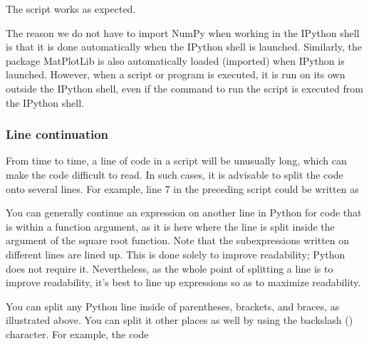 \documentclass[letterpaper,10pt,english]{sphinxmanual}
\begin{document}
\sphinxAtStartPar
The script works as expected.

\sphinxAtStartPar
The reason we do not have to import NumPy when working in the IPython shell is that it is done automatically when the IPython shell is launched.  Similarly, the package MatPlotLib is also automatically loaded (imported) when IPython is launched.  However, when a script or program is executed, it is run on its own outside the IPython shell, even if the command to run the script is executed from the IPython shell.

\ignorespaces 

\subsubsection{Line continuation}
\label{\detokenize{chap2/chap2_basics:line-continuation}}\label{\detokenize{chap2/chap2_basics:index-18}}
\sphinxAtStartPar
From time to time, a line of code in a script will be unusually long, which can make the code difficult to read.  In such cases, it is advisable to split the code onto several lines. For example, line 7 in the preceding script could be written as

\begin{sphinxVerbatim}[commandchars=\\\{\}]
\end{sphinxVerbatim}

\sphinxAtStartPar
You can generally continue an expression on another line in Python for code that is within a function argument, as it is here where the line is split inside the argument of the square root function.  Note that the sub\sphinxhyphen{}expressions written on different lines are lined up.  This is done solely to improve readability; Python does not require it. Nevertheless, as the whole point of splitting a line is to improve readability, it’s best to line up expressions so as to maximize readability.

\sphinxAtStartPar
You can split any Python line inside of parentheses, brackets, and braces, as illustrated above.  You can split it other places as well by using the backslash (\sphinxcode{\sphinxupquote{\textbackslash{}}}) character.  For example, the code

\begin{sphinxVerbatim}[commandchars=\\\{\}]
\end{sphinxVerbatim}
\end{document}
